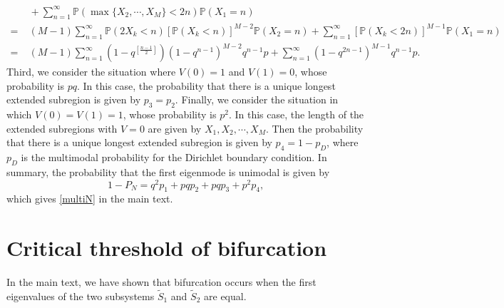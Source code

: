 \documentclass[a4paper,11pt]{article}
\begin{document}
\begin{appendices}
\begin{equation*}
\begin{split}
&\; + \sum_{n=1}^{\infty} \mathbb{P}(\max\{X_2, \cdots, X_M\} < 2 n) \mathbb{P}(X_1 = n) \\
= &\; (M-1) \sum_{n=1}^{\infty} \mathbb{P}(2 X_k < n) [\mathbb{P}(X_k < n)]^{M-2} \mathbb{P}(X_2 = n) + \sum_{n=1}^{\infty} [\mathbb{P}(X_k < 2 n)]^{M-1} \mathbb{P}(X_1 = n) \\
= &\; (M-1) \sum_{n=1}^{\infty} (1 - q^{[\frac{n-1}{2}]}) (1 - q^{n-1})^{M-2} q^{n-1} p + \sum_{n=1}^{\infty} (1 - q^{2n-1})^{M-1} q^{n-1} p.
\end{split}
\end{equation*}
Third, we consider the situation where $V(0) = 1$ and $V(1) = 0$, whose probability is $pq$. In this case, the probability that there is a unique longest extended subregion is given by $p_3 = p_2$. Finally, we consider the situation in which $V(0) = V(1) = 1$, whose probability is $p^2$. In this case, the length of the extended subregions with $V = 0$ are given by $X_1, X_2, \cdots, X_M$. Then the probability that there is a unique longest extended subregion is given by $p_4 = 1-p_D$, where $p_D$ is the multimodal probability for the Dirichlet boundary condition. In summary, the probability that the first eigenmode is unimodal is given by
\begin{equation*}
1-P_N = q^2p_1+pqp_2+pqp_3+p^2p_4,
\end{equation*}
which gives \eqref{multiN} in the main text.


\section{Critical threshold of bifurcation}\label{appC}
In the main text, we have shown that bifurcation occurs when the first eigenvalues of the two subsystems $\tilde{S}_1$ and $\tilde{S}_2$ are equal.


\end{appendices}
\end{document}
